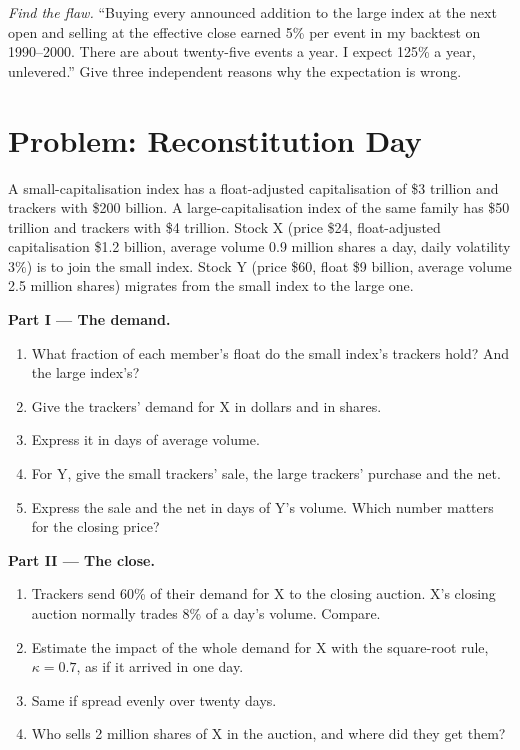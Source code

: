 \begin{exercise}[$\star\star\star$]\label{exo:m1:index-construction-and-rebalancing:8}
\emph{Find the flaw.} ``Buying every announced addition to the large index at
the next open and selling at the effective close earned 5\% per event in my
backtest on 1990--2000. There are about twenty-five events a year. I expect
125\% a year, unlevered.'' Give three independent reasons why the expectation
is wrong.
\end{exercise}

\section{Problem: Reconstitution Day}

\begin{problem}\label{pb:m1:index-construction-and-rebalancing:1}
A small-capitalisation index has a float-adjusted capitalisation of \$3
trillion and trackers with \$200 billion. A large-capitalisation index of the
same family has \$50 trillion and trackers with \$4 trillion. Stock X (price
\$24, float-adjusted capitalisation \$1.2 billion, average volume 0.9 million
shares a day, daily volatility 3\%) is to join the small index. Stock Y (price
\$60, float \$9 billion, average volume 2.5 million shares) migrates from the
small index to the large one.

\medskip\noindent\textbf{Part I --- The demand.}
\begin{enumerate}
\item What fraction of each member's float do the small index's trackers
hold? And the large index's?
\item Give the trackers' demand for X in dollars and in shares.
\item Express it in days of average volume.
\item For Y, give the small trackers' sale, the large trackers' purchase and
the net.
\item Express the sale and the net in days of Y's volume. Which number
matters for the closing price?
\end{enumerate}

\medskip\noindent\textbf{Part II --- The close.}
\begin{enumerate}[resume]
\item Trackers send 60\% of their demand for X to the closing auction. X's
closing auction normally trades 8\% of a day's volume. Compare.
\item Estimate the impact of the whole demand for X with the square-root
rule, $\kappa = 0.7$, as if it arrived in one day.
\item Same if spread evenly over twenty days.
\item Who sells 2 million shares of X in the auction, and where did they get
them?
\end{enumerate}


\end{problem}
